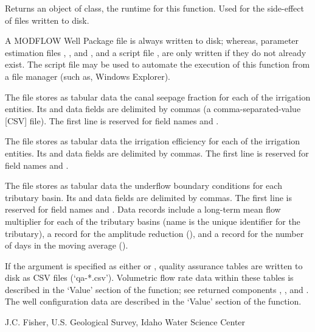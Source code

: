 \documentclass[letterpaper]{book}
\begin{document}
%
\begin{Value}
Returns an object of  class, the runtime for this function.
Used for the side-effect of files written to disk.

A MODFLOW Well Package file  is always written to disk; whereas,
parameter estimation files , , and , and
a script file , are only written if they do not already exist.
The script file may be used to automate the execution of this function from a file manager (such as, Windows Explorer).

The  file stores as tabular data the canal seepage fraction for each of the irrigation entities.
Its  and  data fields are delimited by commas (a comma-separated-value [CSV] file).
The first line is reserved for field names  and .

The  file stores as tabular data the irrigation efficiency for each of the irrigation entities.
Its  and  data fields are delimited by commas.
The first line is reserved for field names  and .

The  file stores as tabular data the underflow boundary conditions for each tributary basin.
Its  and  data fields are delimited by commas.
The first line is reserved for field names  and .
Data records include a long-term mean flow multiplier for each of the tributary basins (name is the unique identifier for the tributary),
a record for the amplitude reduction (), and
a record for the number of days in the moving average ().

If the  argument is specified as either  or , quality assurance tables are written to disk as CSV files (`qa-*.csv').
Volumetric flow rate data within these tables is described in the `Value' section of the  function;
see returned  components , , and .
The well configuration data are described in the `Value' section of the  function.
\end{Value}
%
\begin{Author}\relax
J.C. Fisher, U.S. Geological Survey, Idaho Water Science Center
\end{Author}
\end{document}
